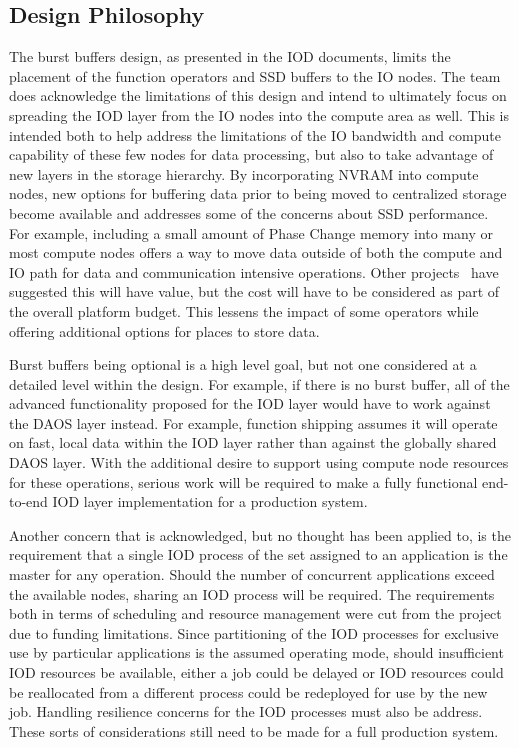 \documentclass[conference]{IEEEtran}
\begin{document}
\subsection{Design Philosophy}
The burst buffers design, as presented in the IOD documents, limits the
placement of the function operators and SSD buffers to the IO nodes. The team
does acknowledge the limitations of this design and intend to ultimately focus
on spreading the IOD layer from the IO nodes into the compute area as well.
This is intended both to help address the limitations of the IO bandwidth and
compute capability of these few nodes for data processing, but also to take
advantage of new layers in the storage hierarchy. By incorporating NVRAM into
compute nodes, new options for buffering data prior to being moved to
centralized storage become available and addresses some of the concerns about
SSD performance. For example, including a small amount of Phase Change memory
into many or most compute nodes offers a way to move data outside of both the
compute and IO path for data and communication intensive operations. Other 
projects~\cite{zheng:2010:predata} have suggested this will have value, but the
cost will have to be considered as part of the overall platform budget. This
lessens the impact of some operators while offering additional options for
places to store data.

Burst buffers being optional is a high level goal, but not one considered at a
detailed level within the design. For example, if there is no burst buffer, all
of the advanced functionality proposed for the IOD layer would have to work
against the DAOS layer instead. For example, function shipping assumes it will
operate on fast, local data within the IOD layer rather than against the
globally shared DAOS layer. With the additional desire to support using compute
node resources for these operations, serious work will be required to make a
fully functional end-to-end IOD layer implementation for a production system.

Another concern that is acknowledged, but no thought has been applied to, is
the requirement that a single IOD process of the set assigned to an application
is the master for any operation.  Should the number of concurrent applications
exceed the available nodes, sharing an IOD process will be required. The
requirements both in terms of scheduling and resource management were cut from
the project due to funding limitations. Since partitioning of the IOD processes
for exclusive use by particular applications is the assumed operating mode,
should insufficient IOD resources be available, either a job could be delayed
or IOD resources could be reallocated from a different process could be
redeployed for use by the new job. Handling resilience concerns for the IOD
processes must also be address.  These sorts of considerations still need to be
made for a full production system.
\end{document}
